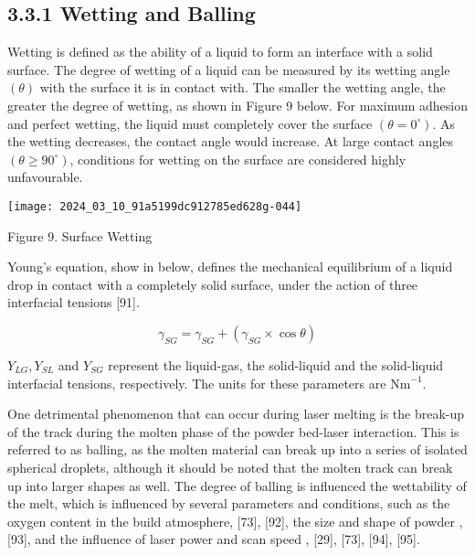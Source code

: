 \documentclass[10pt]{article}
\begin{document}
\subsection*{3.3.1 Wetting and Balling}
Wetting is defined as the ability of a liquid to form an interface with a solid surface. The degree of wetting of a liquid can be measured by its wetting angle $(\theta)$ with the surface it is in contact with. The smaller the wetting angle, the greater the degree of wetting, as shown in Figure 9 below. For maximum adhesion and perfect wetting, the liquid must completely cover the surface $\left(\theta=0^{\circ}\right)$. As the wetting decreases, the contact angle would increase. At large contact angles $\left(\theta \geq 90^{\circ}\right)$, conditions for wetting on the surface are considered highly unfavourable.

\begin{center}
\texttt{[image: 2024\_03\_10\_91a5199dc912785ed628g-044]}
\end{center}

Figure 9. Surface Wetting

Young's equation, show in below, defines the mechanical equilibrium of a liquid drop in contact with a completely solid surface, under the action of three interfacial tensions [91].

$$
\gamma_{S G}=\gamma_{S G}+\left(\gamma_{S G} \times \cos \theta\right)
$$

$Y_{L G}, Y_{S L}$ and $Y_{S G}$ represent the liquid-gas, the solid-liquid and the solid-liquid interfacial tensions, respectively. The units for these parameters are $\mathrm{Nm}^{-1}$.

One detrimental phenomenon that can occur during laser melting is the break-up of the track during the molten phase of the powder bed-laser interaction. This is referred to as balling, as the molten material can break up into a series of isolated spherical droplets, although it should be noted that the molten track can break up into larger shapes as well. The degree of balling is influenced the wettability of the melt, which is influenced by several parameters and conditions, such as the oxygen content in the build atmosphere, [73], [92], the size and shape of powder , [93], and the influence of laser power and scan speed , [29], [73], [94], [95].
\end{document}

